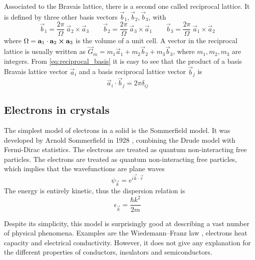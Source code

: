 Associated to the Bravais lattice, there is a second one called reciprocal lattice. It is defined by three other basis vectors $\vec{b}_1, \vec{b}_2, \vec{b}_3$, with
\begin{equation} \label{eq:reciprocal_basis}
    \vec{b}_1 = \frac{2\pi}{\Omega} \ \vec{a}_2 \times \vec{a}_3
    \qquad
    \vec{b}_2 = \frac{2\pi}{\Omega} \ \vec{a}_3 \times \vec{a}_1
    \qquad
    \vec{b}_3 = \frac{2\pi}{\Omega} \ \vec{a}_1 \times \vec{a}_2
\end{equation}
where $\Omega = \mathbf{a}_1 \cdot \mathbf{a}_2 \cross \mathbf{a}_3$ is the volume of a unit cell. A vector in the reciprocal lattice is usually written as $\vec{G}_m = m_1\vec{a}_1 + m_2\vec{b}_2 + m_3\vec{b}_3$, where $m_1, m_2, m_3$ are integers. From \cref{eq:reciprocal_basis} it is easy to see that the product of a basis Bravais lattice vector $\vec{a}_i$ and a basis reciprocal lattice vector $\vec{b}_j$ is
\begin{equation}
    \vec{a}_i \cdot \vec{b}_j = 2\pi \delta_{ij}
\end{equation}

\subsection{Electrons in crystals}
The simplest model of electrons in a solid is the Sommerfield model. It was developed by Arnold Sommerfield in 1928 \cite{sommerfeldZurElektronentheorieMetalle1928}, combining the Drude model \cite{drude1900a} with Fermi-Dirac statistics. The electrons are treated as quantum non-interacting free particles. The electrons are treated as quantum non-interacting free particles, which implies that the wavefunctions are plane waves
\begin{equation} \label{eq:plane_wave}
    \psi_\vec{k} = e^{i\vec{k}\cdot\vec{r}}
\end{equation}
The energy is entirely kinetic, thus the dispersion relation is
\begin{equation} \label{eq:free_dispersion}
    \epsilon_\vec{k} = \frac{\hbar k^2}{2m}
\end{equation}

Despite its simplicity, this model is surprisingly good at describing a vast number of physical phenomena. Examples are the Wiedemann–Franz law \cite{jones1985}, electrons heat capacity and electrical conductivity. However, it does not give any explanation for the different properties of conductors, insulators and semiconductors.

